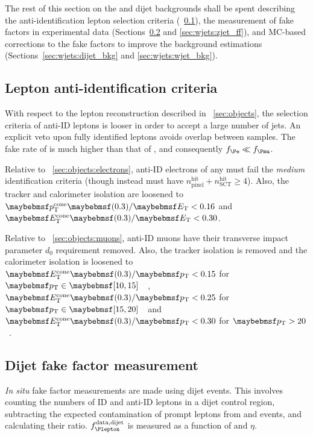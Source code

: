 The rest of this section on the \Wjets and dijet backgrounds shall be spent describing 
the anti-identification lepton selection criteria (\Section~\ref{sec:wjets:antiid}), the 
measurement of fake factors in experimental data (Sections~\ref{sec:wjets:dijet_ff} and 
\ref{sec:wjets:zjet_ff}), and MC-based corrections to the fake factors to improve the 
background estimations (Sections~\ref{sec:wjets:dijet_bkg} and \ref{sec:wjets:wjet_bkg}).



\subsection{Lepton anti-identification criteria}
\label{sec:wjets:antiid}

With respect to the lepton reconstruction described in \Section~\ref{sec:objects}, the 
selection criteria of anti-ID leptons is looser in order to accept a large number of 
jets. An explicit veto upon fully identified leptons avoids overlap between samples. 
The fake rate of \antiid{\Pe} is much higher than that of \antiid{\Pmu}, and 
consequently $f_{\Pe} \ll f_{\Pmu}$.

Relative to \Section~\ref{sec:objects:electrons}, anti-ID electrons of any \pt must fail 
the \textit{medium} identification criteria (though instead must have 
$n_{\text{pixel}}^{\text{hit}} + n_{\text{SCT}}^{\text{hit}} \geq 4$). Also, the tracker 
and calorimeter isolation are loosened to $\ptcone{0.3}/\et < 0.16$ and 
$\etcone{0.3}/\et < 0.30$.

Relative to \Section~\ref{sec:objects:muons}, anti-ID muons have their transverse impact 
parameter $d_0$ requirement removed. Also, the tracker isolation is removed and the 
calorimeter isolation is loosened to $\etcone{0.3}/\pt < 0.15$ for 
\unit{$\pt \in \hardrange{10,15}$}{\GeV}, $\etcone{0.3}/\pt < 0.25$ for 
\unit{$\pt \in \hardrange{15,20}$}{\GeV} and $\etcone{0.3}/\pt < 0.30$ for 
\unit{$\pt > 20$}{\GeV}.





\subsection{Dijet fake factor measurement}
\label{sec:wjets:dijet_ff}

\textit{In situ} fake factor measurements are made using dijet events. This involves 
counting the numbers of ID and anti-ID leptons in a dijet control region, subtracting the 
expected contamination of prompt leptons from \PW and \PZ events, and calculating their 
ratio. $f_{\Plepton}^{\text{data,dijet}}$ is measured as a function of \pt and $\eta$.

